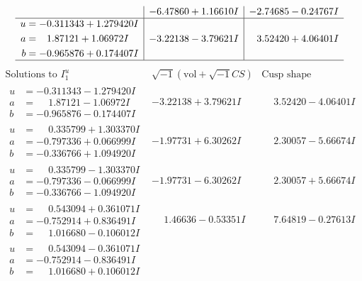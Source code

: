 \documentclass[1p]{elsarticle_modified}
\theoremstyle{definition}
\newcommand{\I}{\sqrt{-1}}
\begin{document}
$$\begin{array}{c|c|c}
 & -6.47860 + 1.16610 I & -2.74685 - 0.24767 I \\ \hline\begin{aligned}
u &= -0.311343 + 1.279420 I \\
a &= \phantom{-}1.87121 + 1.06972 I \\
b &= -0.965876 + 0.174407 I\end{aligned}
 & -3.22138 - 3.79621 I & \phantom{-}3.52420 + 4.06401 I\\
 \hline 
 \end{array}$$\newpage$$\begin{array}{c|c|c}  
\text{Solutions to }I^u_{1}& \I (\text{vol} + \sqrt{-1}CS) & \text{Cusp shape}\\
 \hline 
\begin{aligned}
u &= -0.311343 - 1.279420 I \\
a &= \phantom{-}1.87121 - 1.06972 I \\
b &= -0.965876 - 0.174407 I\end{aligned}
 & -3.22138 + 3.79621 I & \phantom{-}3.52420 - 4.06401 I \\ \hline\begin{aligned}
u &= \phantom{-}0.335799 + 1.303370 I \\
a &= -0.797336 + 0.066999 I \\
b &= -0.336766 + 1.094920 I\end{aligned}
 & -1.97731 + 6.30262 I & \phantom{-}2.30057 - 5.66674 I \\ \hline\begin{aligned}
u &= \phantom{-}0.335799 - 1.303370 I \\
a &= -0.797336 - 0.066999 I \\
b &= -0.336766 - 1.094920 I\end{aligned}
 & -1.97731 - 6.30262 I & \phantom{-}2.30057 + 5.66674 I \\ \hline\begin{aligned}
u &= \phantom{-}0.543094 + 0.361071 I \\
a &= -0.752914 + 0.836491 I \\
b &= \phantom{-}1.016680 - 0.106012 I\end{aligned}
 & \phantom{-}1.46636 - 0.53351 I & \phantom{-}7.64819 - 0.27613 I \\ \hline\begin{aligned}
u &= \phantom{-}0.543094 - 0.361071 I \\
a &= -0.752914 - 0.836491 I \\
b &= \phantom{-}1.016680 + 0.106012 I\end{aligned}

\end{array}$$
\end{document}
